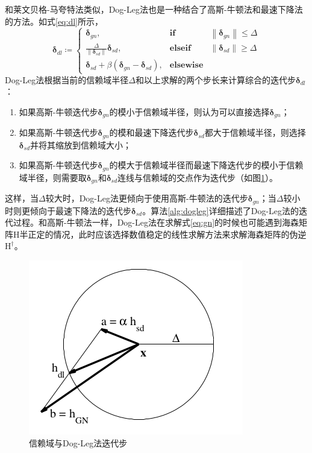 和莱文贝格-马夸特法类似，Dog-Leg法也是一种结合了高斯-牛顿法和最速下降法的方法。如式\eqref{eq:dl}所示，
\begin{equation}
    \bm{\delta}_{dl} \coloneqq \left\{
        \begin{array}{lll}
            \bm{\delta}_{gn}, & \textbf{if} & \left\|\bm{\delta}_{gn}\right\| \leq \Delta \\
            \frac{\Delta}{\left\|\bm{\delta}_{sd}\right\|}\bm{\delta}_{sd}, &
            \textbf{elseif} & \left\|\bm{\delta}_{sd}\right\| \geq \Delta \\
            \bm{\delta}_{sd} + \beta(\bm{\delta}_{gn}-\bm{\delta}_{sd}), & \textbf{elsewise}
        \end{array}
    \right.
    \label{eq:dl}
\end{equation}
Dog-Leg法根据当前的信赖域半径$\Delta$和以上求解的两个步长来计算综合的迭代步$\bm{\delta}_{dl}$：
\begin{enumerate}
    \item 如果高斯-牛顿迭代步$\bm{\delta}_{gn}$的模小于信赖域半径，则认为可以直接选择$\bm{\delta}_{gn}$；
    \item 如果高斯-牛顿迭代步$\bm{\delta}_{gn}$的模和最速下降迭代步$\bm{\delta}_{sd}$都大于信赖域半径，则选择$\bm{\delta}_{sd}$并将其缩放到信赖域大小；
    \item 如果高斯-牛顿迭代步$\bm{\delta}_{gn}$的模大于信赖域半径而最速下降迭代步的模小于信赖域半径，则需要取$\bm{\delta}_{gn}$和$\bm{\delta}_{sd}$连线与信赖域的交点作为迭代步（如图\ref{fig:dogleg_step}）。
\end{enumerate}
这样，当$\Delta$较大时，Dog-Leg法更倾向于使用高斯-牛顿法的迭代步$\bm{\delta}_{gn}$；当$\Delta$较小时则更倾向于最速下降法的迭代步$\bm{\delta}_{sd}$。算法\ref{alg:dogleg}详细描述了Dog-Leg法的迭代过程。和高斯-牛顿法一样，Dog-Leg法在求解式\eqref{eq:gn}的时候也可能遇到海森矩阵$\mathrm{H}$半正定的情况，此时应该选择数值稳定的线性求解方法来求解海森矩阵的伪逆$\mathrm{H}^\dag$。

\begin{figure}[htb!]
    \centering
    \includegraphics[width=.3\textwidth]{figs/dogleg_step.png}
    \caption{信赖域与Dog-Leg法迭代步\citep{tingleff2004methods}}
    \label{fig:dogleg_step}
\end{figure}

